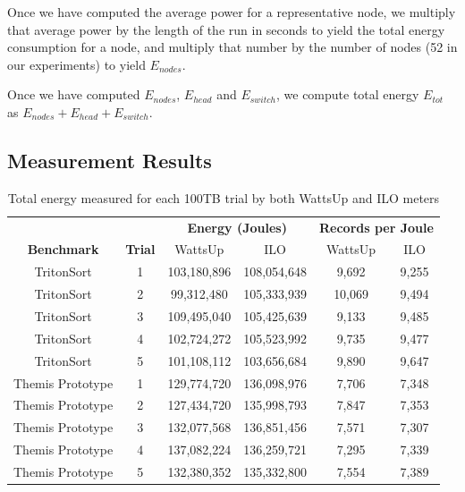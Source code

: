Once we have computed the average power for a representative node, we multiply
that average power by the length of the run in seconds to yield the total energy
consumption for a node, and multiply that number by the number of nodes (52 in
our experiments) to yield $E_{nodes}$.

Once we have computed $E_{nodes}$, $E_{head}$ and $E_{switch}$, we compute
total energy $E_{tot}$ as $E_{nodes} + E_{head} + E_{switch}$.

\subsection{Measurement Results}

\begin{table}
\centering
\caption{\label{table:raw_energy} Total energy measured for each 100TB trial by
  both WattsUp and ILO meters}
\begin{tabular}[t]{|c|c|cc|cc|}
\hline
 &  & \multicolumn{2}{c|}{\textbf{Energy (Joules)}} & \multicolumn{2}{c|}{\textbf{Records
per Joule}}\\
\textbf{Benchmark} & \textbf{Trial} & WattsUp & ILO & WattsUp & ILO\\
\hline
TritonSort & 1 & 103,180,896 & 108,054,648 & 9,692 & 9,255 \\
TritonSort & 2 & 99,312,480 & 105,333,939 & 10,069 & 9,494 \\
TritonSort & 3 & 109,495,040 & 105,425,639 & 9,133 & 9,485 \\
TritonSort & 4 & 102,724,272 & 105,523,992 & 9,735 & 9,477 \\
TritonSort & 5 & 101,108,112 & 103,656,684 & 9,890 & 9,647 \\
\hline
\hline
Themis Prototype & 1 & 129,774,720 & 136,098,976 & 7,706 & 7,348 \\
Themis Prototype & 2 & 127,434,720 & 135,998,793 & 7,847 & 7,353 \\
Themis Prototype & 3 & 132,077,568 & 136,851,456 & 7,571 & 7,307 \\
Themis Prototype & 4 & 137,082,224 & 136,259,721 & 7,295 & 7,339 \\
Themis Prototype & 5 & 132,380,352 & 135,332,800 & 7,554 & 7,389 \\
\hline
\end{tabular}
\end{table}

